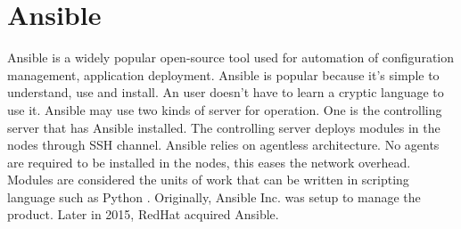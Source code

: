 \section{Ansible}

Ansible is a widely popular open-source tool used for automation of configuration management,
application deployment. Ansible is popular because it’s simple to understand, use and install.
An user doesn’t have to learn a cryptic language to use it.
Ansible may use two kinds of server for operation. One is the controlling server that has Ansible installed.
The controlling server deploys modules in the nodes through SSH channel. Ansible relies on agentless architecture.
No agents are required to be installed in the nodes, this eases the network overhead.
Modules are considered the units of work that can be written in scripting language such as Python  \cite {hid-sp18-417-wiki-Ansible}.
Originally, Ansible Inc. was setup to manage the product. Later in 2015, RedHat acquired Ansible.
